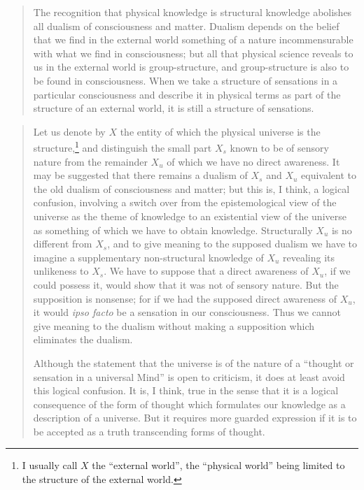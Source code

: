 \begin{quote}
    The recognition that physical knowledge is structural knowledge abolishes all dualism of consciousness and matter.  Dualism depends on the belief that we find in the external world something of a nature incommensurable with what we find in consciousness; but all that physical science reveals to us in the external world is group-structure, and group-structure is also to be found in consciousness.  When we take a structure of sensations in a particular consciousness and describe it in physical terms as part of the structure of an external world, it is still a structure of sensations.  
    
    \citep[p. 150]{Eddington1939}
\end{quote}

\begin{quote}
    Let us denote by $X$ the entity of which the physical universe is the structure,\footnote{I usually call $X$ the ``external world'', the ``physical world'' being limited to the structure of the external world.} and distinguish the small part $X_s$ known to be of sensory nature from the remainder $X_u$ of which we have no direct awareness.  It may be suggested that there remains a dualism of $X_s$ and $X_u$ equivalent to the old dualism of consciousness and matter; but this is, I think, a logical confusion, involving a switch over from the epistemological view of the universe as the theme of knowledge to an existential view of the universe as something of which we have to obtain knowledge.  Structurally $X_u$ is no different from $X_s$, and to give meaning to the supposed dualism we have to imagine a supplementary non-structural knowledge of $X_u$ revealing its unlikeness to $X_s$.  We have to suppose that a direct awareness of $X_u$, if we could possess it, would show that it was not of sensory nature.  But the supposition is nonsense; for if we had the supposed direct awareness of $X_u$, it would \emph{ipso facto} be a sensation in our consciousness.  Thus we cannot give meaning to the dualism without making a supposition which eliminates the dualism.

    Although the statement that the universe is of the nature of a ``thought or sensation in a universal Mind'' is open to criticism, it does at least avoid this logical confusion.  It is, I think, true in the sense that it is a logical consequence of the form of thought which formulates our knowledge as a description of a universe.  But it requires more guarded expression if it is to be accepted as a truth transcending forms of thought.
    

\end{quote}
